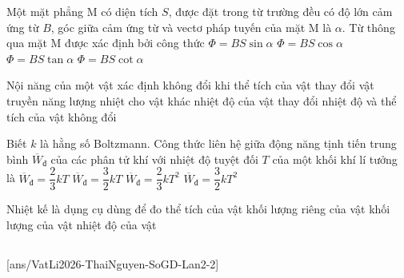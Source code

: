 	\begin{ex}%
		Một mặt phẳng M có diện tích $S$, được đặt trong từ trường đều có độ lớn cảm ứng từ $B$, góc giữa cảm ứng từ và vectơ pháp tuyến của mặt M là $\alpha$. Từ thông qua mặt M được xác định bởi công thức
		\choice
		{$\Phi=BS\sin\alpha$}
		{\True $\Phi=BS\cos\alpha$}
		{$\Phi=BS\tan\alpha$}
		{$\Phi=BS\cot\alpha$}
	\end{ex}

	\begin{ex}%
		Nội năng của một vật xác định không đổi khi
		\choice
		{thể tích của vật thay đổi}
		{vật truyền năng lượng nhiệt cho vật khác}
		{nhiệt độ của vật thay đổi}
		{\True nhiệt độ và thể tích của vật không đổi}
	\end{ex}

	\begin{ex}%
		Biết $k$ là hằng số Boltzmann. Công thức liên hệ giữa động năng tịnh tiến trung bình $\overline{W}_{\text{đ}}$ của các phân tử khí với nhiệt độ tuyệt đối $T$ của một khối khí lí tưởng là
		\choice
		{$\overline{W}_{\text{đ}}=\dfrac{2}{3}kT$}
		{\True $\overline{W}_{\text{đ}}=\dfrac{3}{2}kT$}
		{$\overline{W}_{\text{đ}}=\dfrac{2}{3}kT^2$}
		{$\overline{W}_{\text{đ}}=\dfrac{3}{2}kT^2$}
	\end{ex}

	\begin{ex}%
		Nhiệt kế là dụng cụ dùng để đo
		\choice
		{thể tích của vật}
		{khối lượng riêng của vật}
		{khối lượng của vật}
		{\True nhiệt độ của vật}
	\end{ex}

	\subsection*{}
	\setcounter{ex}{0}
	[ans/VatLi2026-ThaiNguyen-SoGD-Lan2-2]

